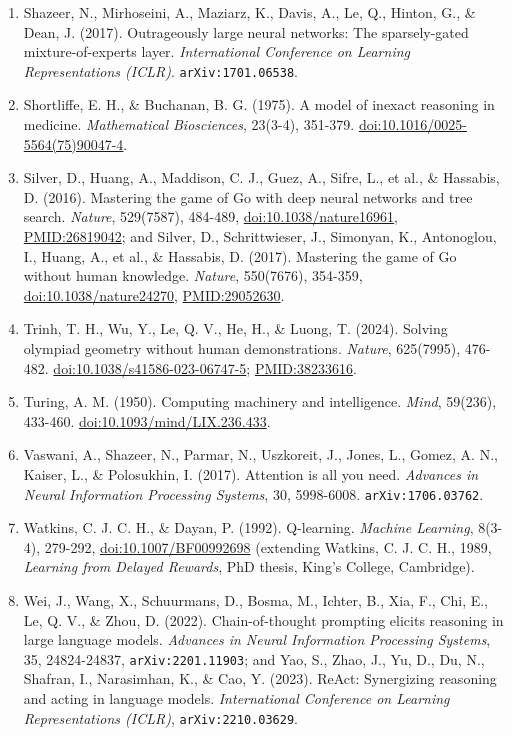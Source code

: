 \documentclass[10pt,letterpaper]{article}
\begin{document}
\begin{enumerate}
  (pp.~173-180), Josiah Macy, Jr.~Foundation, New York (reprinted in C.
  Pias, Ed., \emph{Cybernetics: The Macy Conferences 1946-1953},
  pp.~474-479).
\item
  Shazeer, N., Mirhoseini, A., Maziarz, K., Davis, A., Le, Q., Hinton,
  G., \& Dean, J. (2017). Outrageously large neural networks: The
  sparsely-gated mixture-of-experts layer. \emph{International
  Conference on Learning Representations (ICLR)}.
  \texttt{arXiv:1701.\allowbreak{}06538}.
\item
  Shortliffe, E. H., \& Buchanan, B. G. (1975). A model of inexact
  reasoning in medicine. \emph{Mathematical Biosciences}, 23(3-4),
  351-379.
  \href{https://doi.org/10.1016/0025-5564(75)90047-4}{doi:10.1016/0025-5564(75)90047-4}.
\item
  Silver, D., Huang, A., Maddison, C. J., Guez, A., Sifre, L., et al.,
  \& Hassabis, D. (2016). Mastering the game of Go with deep neural
  networks and tree search. \emph{Nature}, 529(7587), 484-489,
  \href{https://doi.org/10.1038/nature16961}{doi:10.1038/nature16961},
  \url{PMID:26819042}; and Silver, D., Schrittwieser, J., Simonyan, K.,
  Antonoglou, I., Huang, A., et al., \& Hassabis, D. (2017). Mastering
  the game of Go without human knowledge. \emph{Nature}, 550(7676),
  354-359,
  \href{https://doi.org/10.1038/nature24270}{doi:10.1038/nature24270},
  \url{PMID:29052630}.
\item
  Trinh, T. H., Wu, Y., Le, Q. V., He, H., \& Luong, T. (2024). Solving
  olympiad geometry without human demonstrations. \emph{Nature},
  625(7995), 476-482.
  \href{https://doi.org/10.1038/s41586-023-06747-5}{doi:10.1038/s41586-023-06747-5};
  \url{PMID:38233616}.
\item
  Turing, A. M. (1950). Computing machinery and intelligence.
  \emph{Mind}, 59(236), 433-460.
  \href{https://doi.org/10.1093/mind/LIX.236.433}{doi:10.1093/mind/LIX.236.433}.
\item
  Vaswani, A., Shazeer, N., Parmar, N., Uszkoreit, J., Jones, L., Gomez,
  A. N., Kaiser, L., \& Polosukhin, I. (2017). Attention is all you
  need. \emph{Advances in Neural Information Processing Systems}, 30,
  5998-6008. \texttt{arXiv:1706.\allowbreak{}03762}.
\item
  Watkins, C. J. C. H., \& Dayan, P. (1992). Q-learning. \emph{Machine
  Learning}, 8(3-4), 279-292,
  \href{https://doi.org/10.1007/BF00992698}{doi:10.1007/BF00992698}
  (extending Watkins, C. J. C. H., 1989, \emph{Learning from Delayed
  Rewards}, PhD thesis, King's College, Cambridge).
\item
  Wei, J., Wang, X., Schuurmans, D., Bosma, M., Ichter, B., Xia, F.,
  Chi, E., Le, Q. V., \& Zhou, D. (2022). Chain-of-thought prompting
  elicits reasoning in large language models. \emph{Advances in Neural
  Information Processing Systems}, 35, 24824-24837,
  \texttt{arXiv:2201.\allowbreak{}11903}; and Yao, S., Zhao, J., Yu, D., Du, N.,
  Shafran, I., Narasimhan, K., \& Cao, Y. (2023). ReAct: Synergizing
  reasoning and acting in language models. \emph{International
  Conference on Learning Representations (ICLR)},
  \texttt{arXiv:2210.\allowbreak{}03629}.
\end{enumerate}
\end{document}
